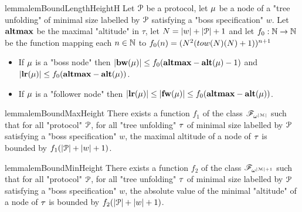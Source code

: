 \begin{restatable}{lemma}{lemBoundLengthHeightH}
	\label{lem:bound-length-at-height-h}
	Let $\mathcal{P}$ be a protocol, let $\mu$ be a node of a "tree unfolding" of minimal size labelled by $\mathcal{P}$ satisfying a "boss specification" $w$.
	Let $\mathbf{altmax}$ be the maximal "altitude" in $\tau$, let $N = |w| + |\mathcal{P}| +1$ and let $f_0 : \mathbb{N} \to \mathbb{N}$ be the function mapping each $n \in \mathbb{N}$ to $f_0(n)=(N^2 (\towerfun(N)(N) + 1))^{n+1}$ 
	
	\begin{itemize}
		\item If $\mu$ is a "boss node" then $|\mathbf{bw}(\mu)| \leq f_0(\mathbf{altmax} - \mathbf{alt}(\mu)-1)$ and $|\mathbf{lr}(\mu)| \leq f_0(\mathbf{altmax} - \mathbf{alt}(\mu))$.
		
		\item If $\mu$ is a "follower node" then $|\mathbf{lr}(\mu)| \leq |\mathbf{fw}(\mu)| \leq  f_0(\mathbf{altmax} - \mathbf{alt}(\mu))$.
	\end{itemize} 
\end{restatable}

\begin{restatable}{lemma}{lemBoundMaxHeight}
	\label{lem:bound-max-height}
	There exists a function $f_1$ of the class $\mathscr{F}_{\omega^{|\mathcal{M}|}}$ such that for all "protocol" $\mathcal{P}$, for all "tree unfolding" $\tau$ of minimal size labelled by $\mathcal{P}$ satisfying a "boss specification" $w$, the maximal altitude of a node of $\tau$ is bounded by $f_1(|\mathcal{P}| + |w|+1)$.
\end{restatable}


\begin{restatable}{lemma}{lemBoundMinHeight}
	\label{lem:bound-min-height}
	There exists a function $f_2$ of the class $\mathscr{F}_{\omega^{|\mathcal{M}|+1}}$ such that for all "protocol" $\mathcal{P}$, for all "tree unfolding" $\tau$ of minimal size labelled by $\mathcal{P}$ satisfying a "boss specification" $w$, the absolute value of the minimal "altitude" of a node of $\tau$ is bounded by $f_2(|\mathcal{P}| + |w|+1)$.
\end{restatable}



